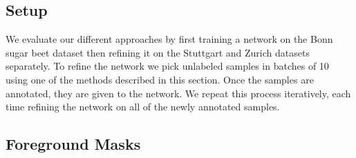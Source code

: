 \documentclass[letterpaper, 10 pt, conference]{ieeeconf}  %
\begin{document}
%
%
%
%
%


\subsection{Setup}

We evaluate our different approaches by first training a network on the Bonn sugar beet dataset then refining it on the Stuttgart and Zurich datasets separately. To refine the network we pick unlabeled samples in batches of 10 using one of the methods described in this section. Once the samples are annotated, they are given to the network. We repeat this process iteratively, each time refining the network on all of the newly annotated samples. 



\subsection{Foreground Masks}
\end{document}
